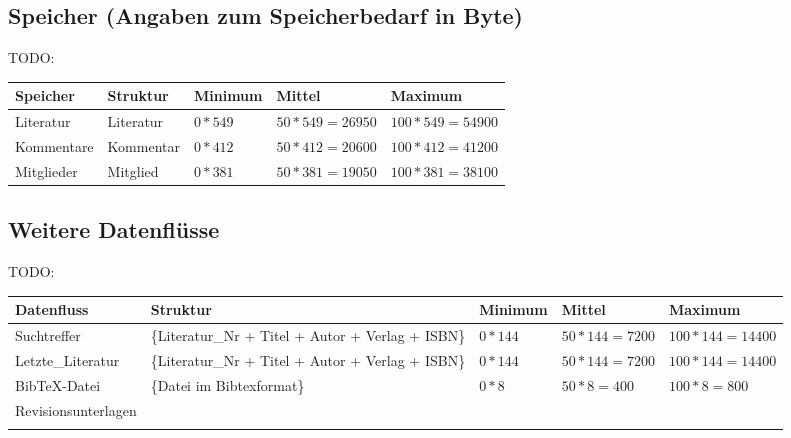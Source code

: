 \subsection{Speicher (Angaben zum Speicherbedarf in Byte)}
TODO:\\
\begin{tabular}[ht]{|l|l|l|l|l|}
\hline
Speicher & Struktur & Minimum & Mittel & Maximum \\
\hline\hline
Literatur & {Literatur} & $0*549$ & $50*549=26950$ & $100*549=54900$ \\
Kommentare & {Kommentar} & $0*412$ & $50*412=20600$ & $100*412=41200$ \\
Mitglieder & {Mitglied}  & $0*381$ & $50*381=19050$ & $100*381=38100$ \\
\hline
\end{tabular}

\subsection{Weitere Datenflüsse}
TODO:\\
\begin{tabular}[ht]{|l|p{3.2cm}|l|l|l|}
\hline
Datenfluss & Struktur & Minimum & Mittel & Maximum \\
\hline\hline

Suchtreffer & \{Literatur\_Nr + Titel + Autor + Verlag + ISBN\}  & $0*144$ & $50*144=7200$ & $100*144=14400$ \\
Letzte\_Literatur & \{Literatur\_Nr + Titel + Autor + Verlag + ISBN\}  & $0*144$ & $50*144=7200$ & $100*144=14400$ \\
BibTeX-Datei & \{Datei im Bibtexformat\} & $0*8$ & $50*8=400$ & $100*8=800$ \\
Revisionsunterlagen &                      &      &            &            \\
 
\\
\hline
\end{tabular}

